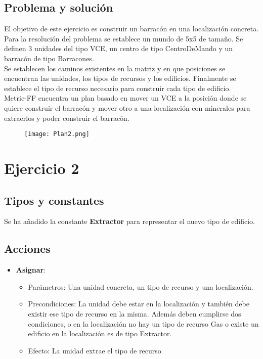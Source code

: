 \subsection{Problema y solución}
El objetivo de este ejercicio es construir un barracón en una localización concreta.\\
Para la resolución del problema se establece un mundo de 5x5 de tamaño. Se definen 3 unidades del tipo VCE, un centro de tipo CentroDeMando y un barracón de tipo Barracones.\\
Se establecen los caminos existentes en la matriz y en que posiciones se encuentran las unidades, los tipos de recursos y los edificios. Finalmente se establece el tipo de recurso necesario para construir cada tipo de edificio.\\
Metric-FF encuentra un plan basado en mover un VCE a la posición donde se quiere construir el barracón y mover otro a una localización con minerales para extraerlos y poder construir el barracón.
\begin{figure}[H]
   \centering
   \texttt{[image: Plan2.png]}
\end{figure}

\section{Ejercicio 2}
\subsection{Tipos y constantes}
Se ha añadido la constante \textbf{Extractor} para representar el nuevo tipo de edificio.
\subsection{Acciones}
\begin{itemize}
   \item \textbf{Asignar}:
   \begin{itemize}
      \item Parámetros: Una unidad concreta, un tipo de recurso y una localización.
      \item Precondiciones: La unidad debe estar en la localización y también debe existir ese tipo de recurso en la misma. Además deben cumplirse dos condiciones, o en la localización no hay un tipo de recurso Gas o existe un edificio en la localización es de tipo Extractor.
      \item Efecto: La unidad extrae el tipo de recurso
   \end{itemize}
   \end{itemize}
